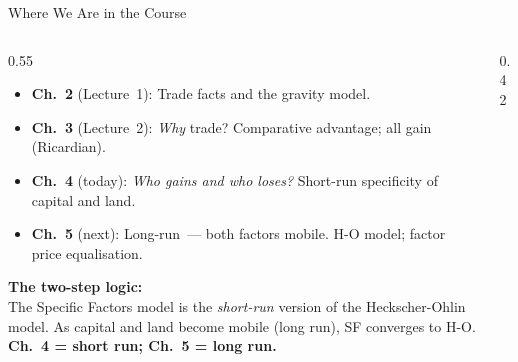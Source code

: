 \documentclass[aspectratio=169]{beamer}
\begin{document}
\begin{frame}{Where We Are in the Course}
\begin{columns}[T]
\begin{column}{0.55\textwidth}
\begin{itemize}\small
  \item \textbf{Ch.~2} (Lecture~1): Trade facts and the
        gravity model.
  \item \textbf{Ch.~3} (Lecture~2): \emph{Why} trade?
        Comparative advantage; all gain (Ricardian).
  \item \textbf{Ch.~4} (today): \emph{Who gains and who
        loses?}  Short-run specificity of capital and land.
  \item \textbf{Ch.~5} (next): Long-run~--- both factors
        mobile.  H-O model; factor price equalisation.
\end{itemize}
\vspace{0.4em}
\begin{varbox}
\footnotesize\textbf{The two-step logic:}\\[0.2em]
The Specific Factors model is the \emph{short-run} version
of the Heckscher-Ohlin model.  As capital and land become
mobile (long run), SF converges to H-O.\\[0.2em]
\textbf{Ch.~4 = short run;  Ch.~5 = long run.}
\end{varbox}
\end{column}
\begin{column}{0.42\textwidth}
\end{column}
\end{columns}
\end{frame}
\end{document}

